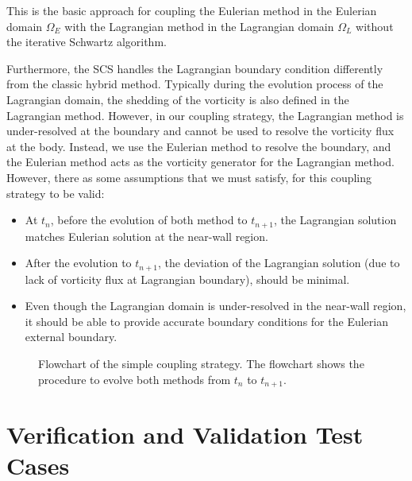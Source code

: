 This is the basic approach for coupling the Eulerian method in the Eulerian domain $\Omega_E$ with the Lagrangian method in the Lagrangian domain $\Omega_L$ without the iterative Schwartz algorithm. 

Furthermore, the SCS handles the Lagrangian boundary condition differently from the classic hybrid method. Typically during the evolution process of the Lagrangian domain, the shedding of the vorticity is also defined in the Lagrangian method. However, in our coupling strategy, the Lagrangian method is under-resolved at the boundary and cannot be used to resolve the vorticity flux at the body. Instead, we use the Eulerian method to resolve the boundary, and the Eulerian method acts as the vorticity generator for the Lagrangian method. However, there as some assumptions that we must satisfy, for this coupling strategy to be valid:

	\begin{itemize}
	\item At $t_n$, before the evolution of both method to $t_{n+1}$, the Lagrangian solution matches Eulerian solution at the near-wall region.
	\item After the evolution to $t_{n+1}$, the deviation of the Lagrangian solution (due to lack of vorticity flux at Lagrangian boundary), should be minimal.
	\item Even though the Lagrangian domain is under-resolved in the near-wall region, it should be able to provide accurate boundary conditions for the Eulerian external boundary.
	\end{itemize}
	
	\begin{figure}[!t]
		\centering
		\caption{Flowchart of the simple coupling strategy. The flowchart shows the procedure to evolve both methods from $t_n$ to $t_{n+1}$.}
		\label{fig:flowchart_simpleCoupling}
	\end{figure}

\section{Verification and Validation Test Cases}

